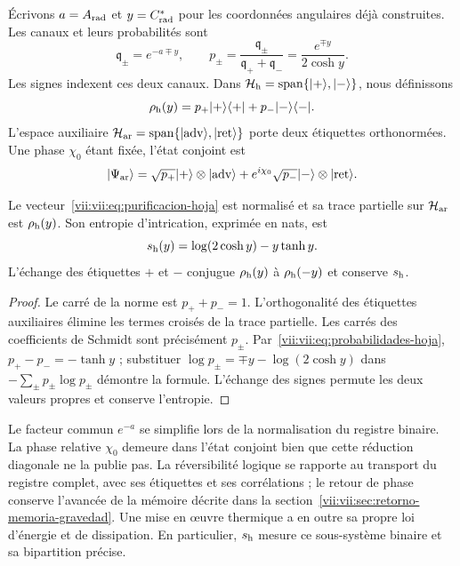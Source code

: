 Écrivons \(a=A_{\rm rad}\) et \(y=C^*_{\rm rad}\) pour les
coordonnées angulaires déjà construites. Les canaux et leurs probabilités sont
\begin{equation}
 \mathfrak q_\pm=e^{-a\mp y},\qquad
 p_\pm=\frac{\mathfrak q_\pm}{\mathfrak q_++\mathfrak q_-}
       =\frac{e^{\mp y}}{2\cosh y}.
 \label{vii:vii:eq:probabilidades-hoja}
\end{equation}
Les signes indexent ces deux canaux. Dans
\(\mathcal H_{\rm h}=\operatorname{span}\{|+\rangle,|-\rangle\}\),
nous définissons
\[
 \rho_{\rm h}(y)=p_+|+\rangle\langle+|+p_-|-\rangle\langle-|.
\]
L'espace auxiliaire \(\mathcal H_{\rm ar}=\operatorname{span}
\{|\mathrm{adv}\rangle,|\mathrm{ret}\rangle\}\) porte deux étiquettes orthonormées. Une phase \(\chi_0\) étant fixée, l'état conjoint est
\begin{equation}
 |\Psi_{\rm ar}\rangle
 =\sqrt{p_+}|+\rangle\otimes|\mathrm{adv}\rangle
  +e^{i\chi_0}\sqrt{p_-}|-\rangle\otimes|\mathrm{ret}\rangle.
 \label{vii:vii:eq:purificacion-hoja}
\end{equation}

\begin{proposition}
\label{vii:vii:prop:purificacion-hoja}
Le vecteur~\eqref{vii:vii:eq:purificacion-hoja} est normalisé et sa trace
partielle sur \(\mathcal H_{\rm ar}\) est \(\rho_{\rm h}(y)\).
Son entropie d'intrication, exprimée en nats, est
\begin{equation}
 s_{\rm h}(y)=\log(2\cosh y)-y\tanh y.
 \label{vii:vii:eq:entropia-hoja}
\end{equation}
L'échange des étiquettes \(+\) et \(-\) conjugue
\(\rho_{\rm h}(y)\) à \(\rho_{\rm h}(-y)\) et conserve
\(s_{\rm h}\).
\end{proposition}
\begin{proof}
Le carré de la norme est \(p_++p_-=1\). L'orthogonalité des étiquettes auxiliaires élimine les termes croisés de la trace partielle. Les carrés des coefficients de Schmidt sont précisément \(p_\pm\). Par~\eqref{vii:vii:eq:probabilidades-hoja}, \(p_+-p_-=-\tanh y\) ; substituer \(\log p_\pm=\mp y-\log(2\cosh y)\) dans \(-\sum_\pm p_\pm\log p_\pm\) démontre la formule. L'échange des signes permute les deux valeurs propres et conserve l'entropie.
\end{proof}

Le facteur commun \(e^{-a}\) se simplifie lors de la normalisation du registre binaire.
La phase relative \(\chi_0\) demeure dans l'état conjoint bien que cette
réduction diagonale ne la publie pas. La réversibilité logique se rapporte
au transport du registre complet, avec ses étiquettes et ses corrélations ;
le retour de phase conserve l'avancée de la mémoire décrite dans la
section~\ref{vii:vii:sec:retorno-memoria-gravedad}. Une mise en œuvre thermique
a en outre sa propre loi d'énergie et de dissipation. En particulier,
\(s_{\rm h}\) mesure ce sous-système binaire et sa bipartition précise.

